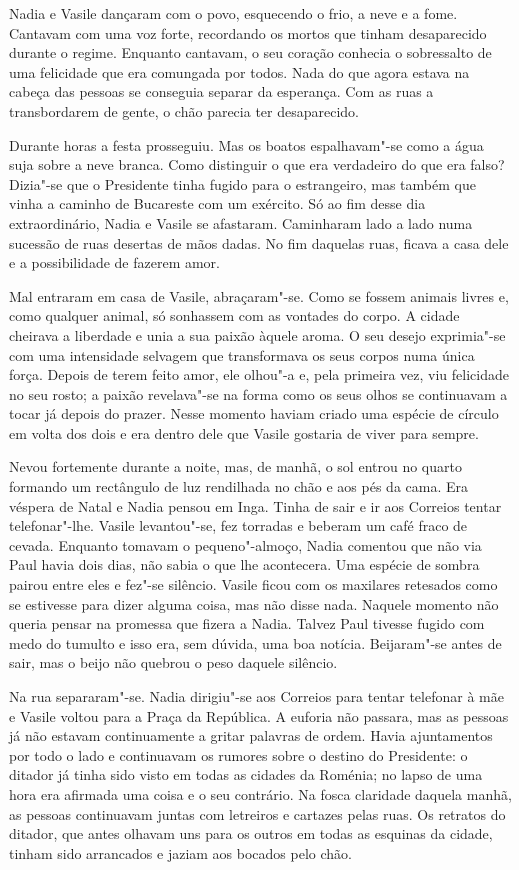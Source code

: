 Nadia e Vasile dançaram com o povo, esquecendo o frio, a neve e a fome.
Cantavam com uma voz forte, recordando os mortos que tinham
desaparecido durante o regime. Enquanto cantavam, o seu coração conhecia
o sobressalto de uma felicidade que era comungada por todos. Nada do que
agora estava na cabeça das pessoas se conseguia separar da esperança.
Com as ruas a transbordarem de gente, o chão parecia ter desaparecido.

Durante horas a festa prosseguiu. Mas os boatos espalhavam"-se como a
água suja sobre a neve branca. Como distinguir o que era verdadeiro do
que era falso? Dizia"-se que o Presidente tinha fugido para o
estrangeiro, mas também que vinha a caminho de Bucareste com um exército. Só ao fim desse dia extraordinário, Nadia e Vasile se afastaram.
Caminharam lado a lado numa sucessão de ruas desertas de mãos dadas. No
fim daquelas ruas, ficava a casa dele e a possibilidade de fazerem amor.

Mal entraram em casa de Vasile, abraçaram"-se. Como se fossem animais
livres e, como qualquer animal, só sonhassem com as vontades do corpo. A
cidade cheirava a liberdade e unia a sua paixão àquele aroma. O seu
desejo exprimia"-se com uma intensidade selvagem que transformava os seus
corpos numa única força. Depois de
terem feito amor, ele olhou"-a e, pela primeira vez, viu felicidade no
seu rosto; a paixão revelava"-se na forma como os seus olhos se
continuavam a tocar já depois do prazer. Nesse momento haviam criado uma
espécie de círculo em volta dos dois e era dentro dele que Vasile
gostaria de viver para sempre.

Nevou fortemente durante a noite, mas, de manhã, o sol entrou no quarto
formando um rectângulo de luz rendilhada no chão e aos pés da cama.
Era véspera de Natal e Nadia pensou em Inga. Tinha de sair e ir aos
Correios tentar telefonar"-lhe. Vasile levantou"-se, fez torradas e beberam um café fraco de cevada. Enquanto tomavam o pequeno"-almoço, Nadia
comentou que não via Paul havia dois dias, não sabia o que lhe
acontecera. Uma espécie de sombra pairou entre eles e fez"-se silêncio.
Vasile ficou com os maxilares retesados como se estivesse para dizer
alguma coisa, mas não disse nada. Naquele momento não queria pensar na
promessa que fizera a Nadia. Talvez Paul tivesse fugido com medo do
tumulto e isso era, sem dúvida, uma boa notícia. Beijaram"-se antes de
sair, mas o beijo não quebrou o peso daquele silêncio.

Na rua separaram"-se. Nadia dirigiu"-se aos Correios
para tentar telefonar à mãe e Vasile voltou para a Praça da República. A
euforia não passara, mas as pessoas já não estavam continuamente a
gritar palavras de ordem. Havia ajuntamentos por todo o lado e
continuavam os rumores sobre o destino do Presidente: o ditador já tinha
sido visto em todas as cidades da Roménia; no lapso de uma hora era
afirmada uma coisa e o seu contrário. Na fosca claridade daquela
manhã, as pessoas continuavam juntas
com letreiros e cartazes pelas ruas. Os retratos do ditador, que antes
olhavam uns para os outros em todas as esquinas da cidade, tinham sido
arrancados e jaziam aos bocados pelo chão.

